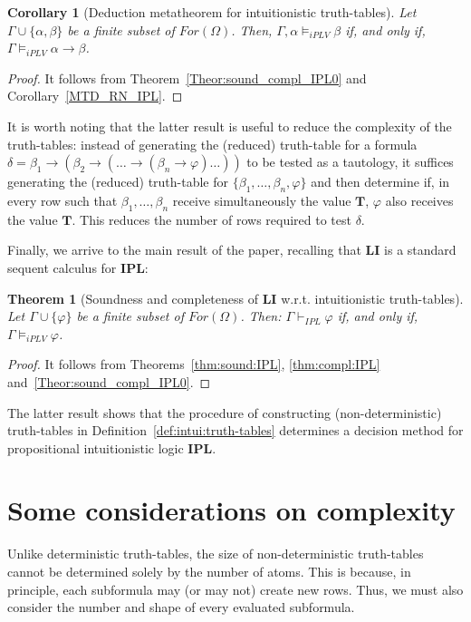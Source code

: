 \documentclass[12pt]{article}
\newtheorem{theorem}{Theorem}[section]
\newtheorem{corollary}{Corollary}[theorem]
\newcommand{\bT}{\mathbf{T}}
\newcommand{\ipl}{\ensuremath{\mathbf{IPL}}}
\begin{document}
\begin{corollary} [Deduction metatheorem for intuitionistic truth-tables] \label{MTD_iPLV}  Let $\Gamma \cup\{\alpha,\beta\}$ be  a finite subset of  $For(\Omega)$. Then, $\Gamma, \alpha \models_{iPLV} \beta$  if, and only if, $\Gamma \models_{iPLV} \alpha \to \beta$. 
\end{corollary}
\begin{proof} It follows from  Theorem~\ref{Theor:sound_compl_IPL0} and Corollary~\ref{MTD_RN_IPL}.
\end{proof}

It is worth noting that the latter result is useful to reduce the complexity of the truth-tables: instead of generating the (reduced) truth-table for a formula $\delta=\beta_1 \to (\beta_2 \to(\ldots \to(\beta_n \to \varphi) \ldots))$ to be tested as a tautology, it suffices generating the (reduced) truth-table for $\{\beta_1,\ldots,\beta_n, \varphi\}$ and then determine if, in every row such that $\beta_1,\ldots,\beta_n$ receive simultaneously the value $\bT$, $\varphi$ also receives the value $\bT$. This reduces the number of rows required to test $\delta$.


Finally, we arrive to the main result of the paper, recalling that {\bf LI} is a standard sequent calculus for \ipl:


\begin{theorem} [Soundness and completeness of  {\bf LI} w.r.t. intuitionistic truth-tables] \label{Theor:sound_compl_IPL1} Let $\Gamma \cup\{\varphi\}$ be  a finite subset of  $For(\Omega)$. Then: $\Gamma\vdash_{IPL} \varphi$ if, and only if, $\Gamma \models_{iPLV}\varphi$.
\end{theorem}
\begin{proof} It follows from  Theorems~\ref{thm:sound:IPL}, \ref{thm:compl:IPL}  and~\ref{Theor:sound_compl_IPL0}.
\end{proof}

The latter result shows that the procedure of constructing (non-deterministic) truth-tables in Definition~\ref{def:intui:truth-tables} determines a decision method for propositional intuitionistic logic \ipl.

\section{Some considerations on complexity}\label{complexity}

Unlike deterministic truth-tables, the size of non-deterministic truth-tables cannot be determined solely by the number of atoms. This is because, in principle, each subformula may (or may not) create new rows. Thus, we must also consider the number and shape of every evaluated subformula.
\end{document}
